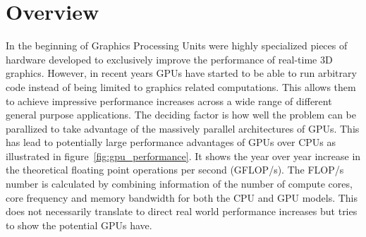 \documentclass[a4paper,11pt]{kth-mag}
\begin{document}
\section{Overview}
In the beginning of Graphics Processing Units were highly specialized pieces of hardware developed to exclusively improve the performance of real-time 3D graphics. However, in recent years GPUs have started to be able to run arbitrary code instead of being limited to graphics related computations. This allows them to achieve impressive performance increases across a wide range of different general purpose applications. The deciding factor is how well the problem can be parallized to take advantage of the massively parallel architectures of GPUs. This has lead to potentially large performance advantages of GPUs over CPUs as illustrated in figure~\ref{fig:gpu_performance}. It shows the year over year increase in the theoretical floating point operations per second (GFLOP/s). The FLOP/s number is calculated by combining information of the number of compute cores, core frequency and memory bandwidth for both the CPU and GPU models. This does not necessarily translate to direct real world performance increases but tries to show the potential GPUs have.
\end{document}
